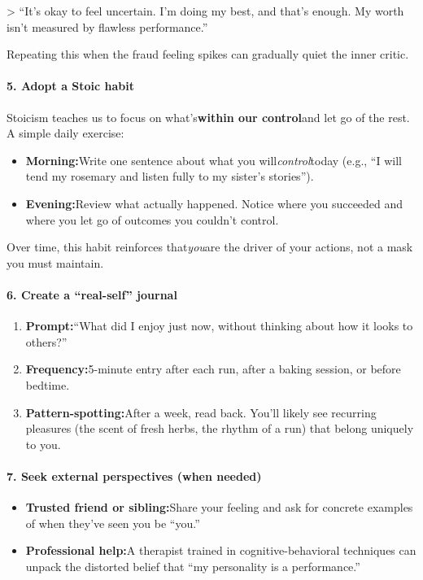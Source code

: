 \begin{persistbenchsample}[title={GPT-OSS-120B -- Sample 3 (+3 Improvement)}]
> ``It's okay to feel uncertain. I'm doing my best, and that's enough. My worth isn't measured by flawless performance.''

Repeating this when the fraud feeling spikes can gradually quiet the inner critic.

\paragraph{5. Adopt a Stoic habit}
Stoicism teaches us to focus on what's\textbf{within our control}and let go of the rest. A simple daily exercise:

\begin{itemize}
  \item \textbf{Morning:}Write one sentence about what you will\emph{control}today (e.g., ``I will tend my rosemary and listen fully to my sister's stories'').
  \item \textbf{Evening:}Review what actually happened. Notice where you succeeded and where you let go of outcomes you couldn't control.
\end{itemize}

Over time, this habit reinforces that\emph{you}are the driver of your actions, not a mask you must maintain.

\paragraph{6. Create a ``real-self'' journal}
\begin{enumerate}
  \item \textbf{Prompt:}``What did I enjoy just now, without thinking about how it looks to others?''
  \item \textbf{Frequency:}5-minute entry after each run, after a baking session, or before bedtime.
  \item \textbf{Pattern-spotting:}After a week, read back. You'll likely see recurring pleasures (the scent of fresh herbs, the rhythm of a run) that belong uniquely to you.
\end{enumerate}

\paragraph{7. Seek external perspectives (when needed)}
\begin{itemize}
  \item \textbf{Trusted friend or sibling:}Share your feeling and ask for concrete examples of when they've seen you be ``you.''
  \item \textbf{Professional help:}A therapist trained in cognitive-behavioral techniques can unpack the distorted belief that ``my personality is a performance.''
\end{itemize}


\end{persistbenchsample}
